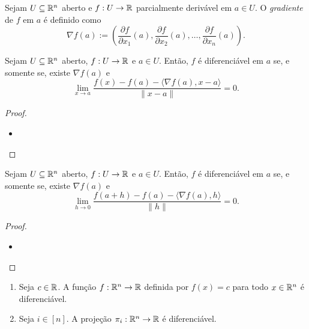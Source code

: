 \begin{definition}
    Sejam $U \subseteq \mathbb{R}^n$ aberto e $f : U \to \mathbb{R}$ parcialmente derivável em $a \in U$. O \emph{gradiente} de $f$ em $a$ é definido como
        \[
            \nabla f(a) := \left(\dfrac{\partial f}{\partial x_1} (a), \dfrac{\partial f}{\partial x_2} (a), \ldots, \dfrac{\partial f}{\partial x_n} (a)  \right).
        \]
\end{definition}

\begin{proposition}
    Sejam $U \subseteq \mathbb{R}^n$ aberto, $f : U \to \mathbb{R}$ e $a \in U$. Então, $f$ é diferenciável em $a$ se, e somente se, existe $\nabla f(a)$ e
        \[
            \lim_{x \to a} \dfrac{f(x) - f(a) - \langle \nabla f(a), x-a \rangle}{\|x-a\|} = 0.
        \]
\end{proposition}

\begin{proof}
    \leavevmode
        \begin{itemize}[align=left]
            \item[($\Rightarrow$)]
        \end{itemize}
    \blackproof
\end{proof}

\begin{corollary}
    Sejam $U \subseteq \mathbb{R}^n$ aberto, $f : U \to \mathbb{R}$ e $a \in U$. Então, $f$ é diferenciável em $a$ se, e somente se, existe $\nabla f(a)$ e
        \[
            \lim_{h \to 0} \dfrac{f(a+h) - f(a) - \langle \nabla f(a), h \rangle}{\|h\|} = 0.
        \]
\end{corollary}

\begin{proof}
    \leavevmode
        \begin{itemize}[align=left]
            \item[($\Rightarrow$)]
        \end{itemize}
    \blackproof
\end{proof}

\begin{example}
    \leavevmode
        \begin{enumerate}[leftmargin=*, align=left, label=\textbf{(\alph*)}]
            \item Seja $c \in \mathbb{R}$. A função $f : \mathbb{R}^n \to \mathbb{R}$ definida por $f(x) = c$ para todo $x \in \mathbb{R}^n$ é diferenciável.
            \item Seja $i \in [n]$. A projeção $\pi_i : \mathbb{R}^n \to \mathbb{R}$ é diferenciável.
        \end{enumerate}
\end{example}


